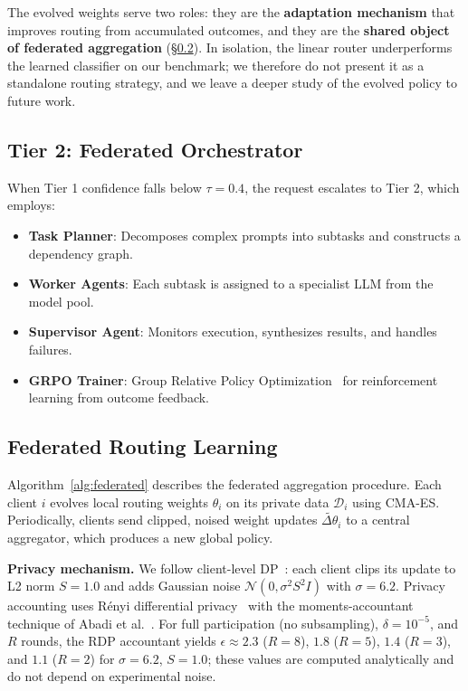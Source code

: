 \documentclass[11pt,a4paper]{article}
\newcommand{\dataset}{\mathcal{D}}
\begin{document}
The evolved weights serve two roles: they are the \textbf{adaptation mechanism} that improves routing from accumulated outcomes, and they are the \textbf{shared object of federated aggregation} (\S\ref{sec:federated}).
In isolation, the linear router underperforms the learned classifier on our benchmark; we therefore do not present it as a standalone routing strategy, and we leave a deeper study of the evolved policy to future work.

\subsection{Tier 2: Federated Orchestrator}

When Tier 1 confidence falls below $\tau = 0.4$, the request escalates to Tier 2, which employs:
\begin{itemize}[leftmargin=*]
    \item \textbf{Task Planner}: Decomposes complex prompts into subtasks and constructs a dependency graph.
    \item \textbf{Worker Agents}: Each subtask is assigned to a specialist LLM from the model pool.
    \item \textbf{Supervisor Agent}: Monitors execution, synthesizes results, and handles failures.
    \item \textbf{GRPO Trainer}: Group Relative Policy Optimization~\cite{grpo2024} for reinforcement learning from outcome feedback.
\end{itemize}

\subsection{Federated Routing Learning}
\label{sec:federated}

Algorithm~\ref{alg:federated} describes the federated aggregation procedure.
Each client $i$ evolves local routing weights $\theta_i$ on its private data $\dataset_i$ using CMA-ES.
Periodically, clients send clipped, noised weight updates $\tilde{\Delta\theta}_i$ to a central aggregator, which produces a new global policy.

\textbf{Privacy mechanism.}
We follow client-level DP~\cite{mcmahan2018}: each client clips its update to L2 norm $S = 1.0$ and adds Gaussian noise $\mathcal{N}(0, \sigma^2 S^2 I)$ with $\sigma = 6.2$.
Privacy accounting uses R\'enyi differential privacy~\cite{mironov2017} with the moments-accountant technique of Abadi et al.~\cite{abadi2016}.
For full participation (no subsampling), $\delta = 10^{-5}$, and $R$ rounds, the RDP accountant yields $\epsilon \approx 2.3$ ($R=8$), $1.8$ ($R=5$), $1.4$ ($R=3$), and $1.1$ ($R=2$) for $\sigma = 6.2$, $S = 1.0$; these values are computed analytically and do not depend on experimental noise.
\end{document}
